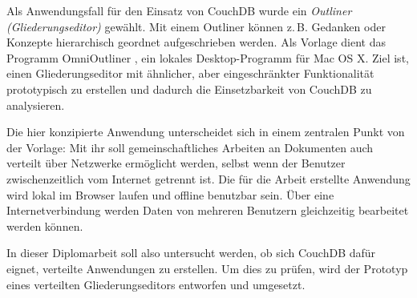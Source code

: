 Als Anwendungsfall für den Einsatz von CouchDB wurde ein \textit{Outliner (Gliederungseditor)} gewählt. Mit einem Outliner können z.\,B. Gedanken oder Konzepte hierarchisch geordnet aufgeschrieben werden. Als Vorlage dient das Programm OmniOutliner \cite{omnioutliner:website}, ein lokales Desktop-Programm für Mac OS X. Ziel ist, einen Gliederungseditor mit ähnlicher, aber eingeschränkter Funktionalität prototypisch zu erstellen und dadurch die Einsetzbarkeit von CouchDB zu analysieren.

Die hier konzipierte Anwendung unterscheidet sich in einem zentralen Punkt von der Vorlage: Mit ihr soll gemeinschaftliches Arbeiten an Dokumenten auch verteilt über Netzwerke ermöglicht werden, selbst wenn der Benutzer zwischenzeitlich vom Internet getrennt ist. Die für die Arbeit erstellte Anwendung wird lokal im Browser laufen und offline benutzbar sein. Über eine Internetverbindung werden Daten von mehreren Benutzern gleichzeitig bearbeitet werden können.

In dieser Diplomarbeit soll also untersucht werden, ob sich CouchDB dafür eignet, verteilte Anwendungen zu erstellen. Um dies zu prüfen, wird der Prototyp eines verteilten Gliederungseditors entworfen und umgesetzt. 


